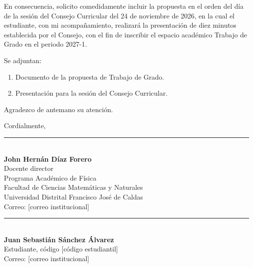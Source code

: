 \documentclass[11pt,letterpaper]{article}
\begin{document}
En consecuencia, solicito comedidamente incluir la propuesta en el orden del día de la sesión del Consejo Curricular del
24 de noviembre de 2026, en la cual el estudiante, con mi acompañamiento, realizará la presentación de diez minutos
establecida por el Consejo, con el fin de inscribir el espacio académico Trabajo de Grado en el periodo 2027-1.

Se adjuntan:
\begin{enumerate}[leftmargin=1.8em, itemsep=0.1em]
  \item Documento de la propuesta de Trabajo de Grado.
  \item Presentación para la sesión del Consejo Curricular.
\end{enumerate}

Agradezco de antemano su atención.

Cordialmente,

\vspace{3.5em}
\rule{7cm}{0.4pt}\\
\textbf{John Hernán Díaz Forero}\\
Docente director\\
Programa Académico de Física\\
Facultad de Ciencias Matemáticas y Naturales\\
Universidad Distrital Francisco José de Caldas\\
Correo: [correo institucional]

\vspace{2em}
\rule{7cm}{0.4pt}\\
\textbf{Juan Sebastián Sánchez Álvarez}\\
Estudiante, código [código estudiantil]\\
Correo: [correo institucional]
\end{document}
